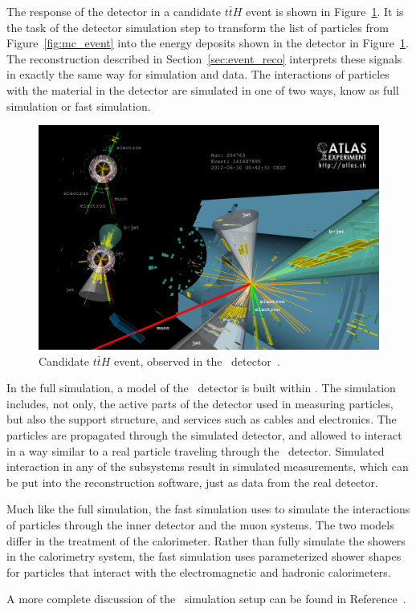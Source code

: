 The response of the detector in a candidate $t\bar{t}H$ event is shown in
Figure~\ref{fig:data_event}.
It is the task of the detector simulation step to transform the list of
particles from Figure~\ref{fig:mc_event} into the energy deposits shown in the
detector in Figure~\ref{fig:data_event}.
The reconstruction described in Section~\ref{sec:event_reco} interprets these
signals in exactly the same way for simulation and data.
The interactions of particles with the material in the detector are
simulated in one of two ways, know as full simulation or fast simulation.

\begin{figure}[ht]
  \centering
  \includegraphics[width=\textwidth, clip=true, trim=0 0 0 0]
  {figs/mc_gen/tth_event.png}
  \caption{
    Candidate $t\bar{t}H$ event, observed in the
    \atlas\ detector~\cite{Aad:2015iha}.
  }
  \label{fig:data_event}
\end{figure}

In the full simulation, a model of the \atlas\ detector is built within .
The simulation includes, not only, the active parts of the detector used in
measuring particles, but also the support structure, and services such as
cables and electronics.
The particles are propagated through the simulated detector, and allowed to
interact in a way similar to a real particle traveling through the
\atlas\ detector.
Simulated interaction in any of the subsystems result in simulated
measurements, which can be put into the reconstruction software, just as
data from the real detector.

Much like the full simulation, the fast simulation uses  to simulate the
interactions of particles through the inner detector and the muon systems.
The two models differ in the treatment of the calorimeter.
Rather than fully simulate the showers in the calorimetry system, the fast
simulation uses parameterized shower shapes for particles that interact with
the electromagnetic and hadronic calorimeters.

A more complete discussion of the \atlas\ simulation setup can be found
in Reference~\cite{ATLASSimulation}.

